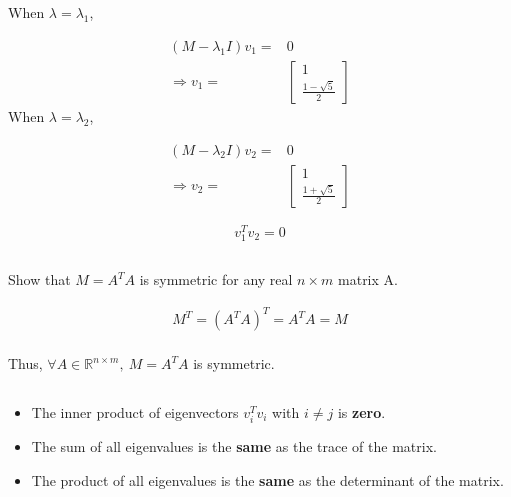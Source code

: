 \documentclass{article}
\newcommand{\RR}{\mathbb{R}}
\begin{document}
\subsection{}

When $\lambda=\lambda_1$,

\begin{align*}
    (M - \lambda_1 I) v_1= & 0\\
    \Rightarrow v_1 = &
    \begin{bmatrix}
        1 \\ \frac{1-\sqrt{5}}{2}
    \end{bmatrix}
\end{align*}
When $\lambda=\lambda_2$,

\begin{align*}
    (M - \lambda_2 I) v_2= & 0\\
    \Rightarrow v_2 = &
    \begin{bmatrix}
        1 \\ \frac{1 + \sqrt{5}}{2}
    \end{bmatrix}
\end{align*}

$$
v_1^Tv_2 = 0
$$

\subsection{}

Show that $M = A^T A$ is symmetric for any real $n \times m$ matrix A.

\begin{align*}
    M^T = (A^TA)^T = A^TA = M
\end{align*}
\\
Thus, $\forall A\in \RR^{n\times m},\ M = A^TA$ is symmetric.

\subsection{}
\begin{itemize}
    \item The inner product of eigenvectors $v_i^Tv_i$  with $i\neq j$ is \textbf{zero}.
    \item The sum of all eigenvalues is the \textbf{same} as the trace of the matrix.
    \item The product of all eigenvalues is the \textbf{same} as the determinant of the matrix.
\end{itemize}

\section{}
\end{document}
